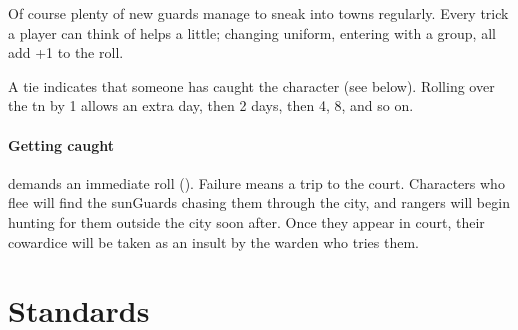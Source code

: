 \begin{multicols}{2}
Of course plenty of new \glspl{guard} manage to sneak into towns regularly.
Every trick a player can think of helps a little; changing uniform, entering with a group, all add +1 to the roll.

A tie indicates that someone has caught the character (see below).
Rolling over the \gls{tn} by 1 allows an extra day, then 2 days, then 4, 8, and so on.

\paragraph{Getting caught}
demands an immediate  roll (\tn[10]).
Failure means a trip to the \gls{court}.
Characters who flee will find the \glspl{sunGuard} chasing them through the city, and \glspl{ranger} will begin hunting for them outside the city soon after.
Once they appear in \gls{court}, their cowardice will be taken as an insult by the \gls{warden} who tries them.%

\end{multicols}


\section{Standards}

